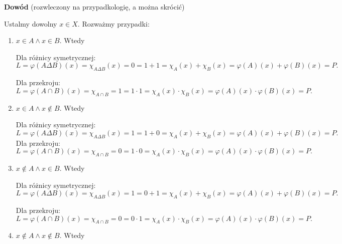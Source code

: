 \begin{solution}
\begin{enumerate}[label=\alph*)]
\begin{enumerate}[label=\arabic*)]
				\noindent \textbf{Dowód} (rozwleczony na przypadkologię, a można skrócić)

				Ustalmy dowolny $x \in X$. Rozważmy przypadki:
				\begin{enumerate}[label=\alph*)]
					\item $x \in A \land x \in B$. Wtedy

						Dla różnicy symetrycznej:
						\[
							L = \varphi \left( A \Delta B \right) \left( x \right) = \chi_{A \Delta B}\left( x \right) = 0 = 1 + 1 = \chi_{A}\left( x \right)  + \chi_{B}\left( x \right) = \varphi\left( A \right) \left( x \right) + \varphi \left( B \right) \left( x \right) = P 
						.\]

						Dla przekroju:
						\[
						L = \varphi \left( A \cap B \right) \left( x \right) = \chi_{A \cap B} = 1 = 1 \cdot 1 = \chi_{A}\left( x \right) \cdot \chi_{B}\left( x \right) = \varphi\left( A \right) \left( x \right) \cdot \varphi \left( B \right) \left( x \right) = P  
						.\] 
					\item $x \in A \land x \not\in  B$. Wtedy

						Dla różnicy symetrycznej:
						\[
							L = \varphi \left( A \Delta B \right) \left( x \right) = \chi_{A \Delta B}\left( x \right) = 1 = 1 +  0 = \chi_{A}\left( x \right)  + \chi_{B}\left( x \right) = \varphi\left( A \right) \left( x \right) + \varphi \left( B \right) \left( x \right) = P 
						.\]
						Dla przekroju:
						\[
						L = \varphi \left( A \cap B \right) \left( x \right) = \chi_{A \cap B} = 0 = 1 \cdot 0 = \chi_{A}\left( x \right) \cdot \chi_{B}\left( x \right) = \varphi\left( A \right) \left( x \right) \cdot \varphi \left( B \right) \left( x \right) = P  
						.\] 
					\item $x \not\in  A \land x \in B$. Wtedy

						Dla różnicy symetrycznej:
						\[
							L = \varphi \left( A \Delta B \right) \left( x \right) = \chi_{A \Delta B}\left( x \right) = 1 = 0 + 1 = \chi_{A}\left( x \right)  + \chi_{B}\left( x \right) = \varphi\left( A \right) \left( x \right) + \varphi \left( B \right) \left( x \right) = P 
						.\]

						Dla przekroju:
						\[
						L = \varphi \left( A \cap B \right) \left( x \right) = \chi_{A \cap B} = 0 = 0 \cdot 1 = \chi_{A}\left( x \right) \cdot \chi_{B}\left( x \right) = \varphi\left( A \right) \left( x \right) \cdot \varphi \left( B \right) \left( x \right) = P  
						.\] 

					\item $x \not\in  A \land x \not\in  B$. Wtedy


\end{enumerate}
\end{enumerate}
\end{enumerate}
\end{solution}
